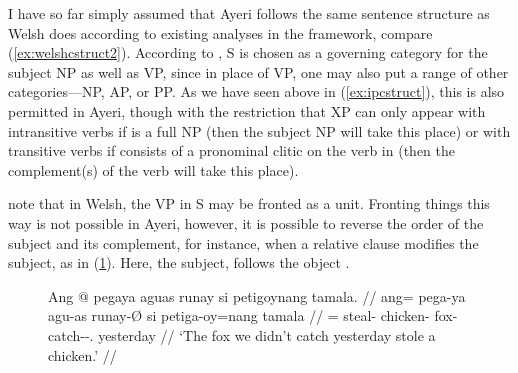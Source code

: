 I have so far simply assumed that Ayeri follows the same sentence structure as
Welsh does according to existing analyses in the \Lfg{} framework, compare
(\ref{ex:welshcstruct2}). According to \citet[130]{bresnan2016}, S is chosen as
a governing category for the subject NP as well as VP, since in place of VP, one may
also put a range of other categories---NP, AP, or PP. As we have seen above in
(\ref{ex:ipcstruct}), this is also permitted in Ayeri, though with the
restriction that XP can only appear with intransitive verbs if \Subj{} is a
full NP (then the subject NP will take this place) or with transitive verbs if
\Subj{} consists of a pronominal clitic on the verb in  (then the
complement(s) of the verb will take this place).


\citet{bresnan2016} note that in Welsh, the VP in S may be fronted as a unit.
Fronting things this way is not possible in Ayeri, however, it is possible to
reverse the order of the subject and its complement, for instance, when a
relative clause modifies the subject, as in (\ref{ex:ayrsinv}). Here, the
subject,  follows the
object .

\begin{figure}
\ex\label{ex:ayrsinv}\begingl
	\gla Ang @ pegaya aguas runay si petigoynang tamala. //
	\glb ang= pega-ya agu-as runay-Ø si petiga-oy=nang tamala //
	\glc \AgtT{}= steal-\TsgM{} chicken-\Parg{} fox-\Top{} \Rel{}
		catch-\Neg{}-\Fpl {}.\Aarg{} yesterday //
	\glft `The fox we didn't catch yesterday stole a chicken.' //
\endgl\xe
\end{figure}

